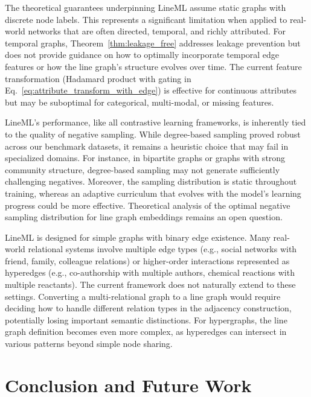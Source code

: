 \documentclass[pdflatex,sn-mathphys-num]{sn-jnl}%
\theoremstyle{thmstyleone}%
\theoremstyle{thmstyletwo}%
\theoremstyle{thmstylethree}%
\theoremstyle{plain} %
\theoremstyle{definition} %
\theoremstyle{remark} %
\theoremstyle{plain} %
\begin{document}
The theoretical guarantees underpinning LineML assume  static graphs with discrete node labels. 
This represents a significant limitation when applied to real-world networks that are often directed, temporal, and richly attributed. 
For temporal graphs, Theorem~\ref{thm:leakage_free} addresses leakage prevention but does not provide guidance on how to optimally incorporate temporal edge features or how the line graph's structure evolves over time. 
The current feature transformation (Hadamard product with gating in Eq.~\ref{eq:attribute_transform_with_edge}) is effective for continuous attributes but may be suboptimal for categorical, multi-modal, or missing features.


LineML's performance, like all contrastive learning frameworks, is inherently tied to the quality of negative sampling. 
While degree-based sampling proved robust across our benchmark datasets, it remains a heuristic choice that may fail in specialized domains. 
For instance, in bipartite graphs or graphs with strong community structure, degree-based sampling may not generate sufficiently challenging negatives. Moreover, the sampling distribution is static throughout training, whereas an adaptive curriculum that evolves with the model's learning progress could be more effective. 
Theoretical analysis of the optimal negative sampling distribution for line graph embeddings remains an open question. 

LineML is designed for simple graphs with binary edge existence. 
Many real-world relational systems involve multiple edge types (e.g., social networks with friend, family, colleague relations) or higher-order interactions represented as hyperedges (e.g., co-authorship with multiple authors, chemical reactions with multiple reactants). 
The current framework does not naturally extend to these settings. 
Converting a multi-relational graph to a line graph would require deciding how to handle different relation types in the adjacency construction, potentially losing important semantic distinctions. 
For hypergraphs, the line graph definition becomes even more complex, as hyperedges can intersect in various patterns beyond simple node sharing. 










\section{Conclusion and Future Work}
\label{sec:conclusion}
\end{document}
